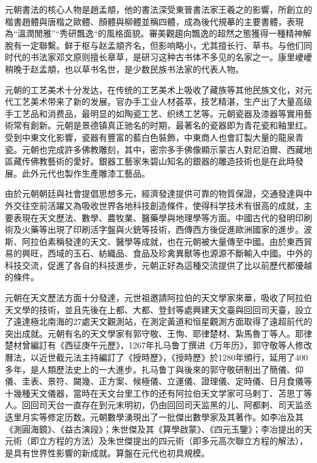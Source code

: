 元朝書法的核心人物是趙孟頫，他的書法深受東晉書法家王羲之的影響，所創立的楷書趙體與唐楷之歐體、顏體與柳體並稱四體，成為後代規摹的主要書體，表現為“溫潤閒雅”“秀研飄逸“的風格面貌。審美觀趨向飄逸的超然之態獲得一種精神解脫有一定聯繫。鲜于枢与赵孟頫齐名，但影响略小，尤其擅长行、草书。与他们同时代的书法家邓文原则擅长章草，是研习这种古书体不多见的名家之一。康里巙巙稍晚于赵孟頫，也以草书名世，是少数民族书法家的代表人物。 　

元朝的工艺美术十分发达，在传统的工艺美术上吸收了藏族等其他民族文化，对元代工艺美术带来了新的发展。官办手工业人材荟萃，技艺精湛，生产出了大量高级手工艺品和消费品，最明显的如陶瓷工艺、织绣工艺等。元朝瓷器及漆器等實用藝術常有創新。元朝是景德镇真正驰名的时期，最著名的瓷器即为青花瓷和釉里红。受到中東文化影響，瓷器有豐富的藍白色裝飾，中東商人也會訂製大量的龍泉青瓷。元朝也完成許多佛教雕刻，其中，密宗多手佛像顯示蒙古人對尼泊爾、西藏地區藏传佛教藝術的愛好。銀器工藝家朱碧山知名的銀器的雕造技術也是在此時發展。此外元代也製作生產雕漆工藝品。

由於元朝朝廷與社會提倡思想多元，經濟發達提供可靠的物質保證，交通發達與中外交往空前活躍又為吸收世界各地科技創造條件，使得科学技术有很高的成就，主要表現在天文歷法、數學、農牧業、醫藥學與地理學等方面。中國古代的發明印刷術及火藥等出現了印刷活字盤與火銃等技術，西傳西方後促進歐洲國家的進步。波斯、阿拉伯素稱發達的天文、醫學等成就，也在元朝被大量傳至中國。由於東西貿易的興旺，西域的玉石、紡織品、食品及珍禽異獸等也源源不斷輸入中國。中外的科技交流，促進了各自的科技進步，元朝正好為這種交流提供了比以前歷代都優越的條件。

元朝在天文歷法方面十分發達，元世祖邀請阿拉伯的天文學家來華，吸收了阿拉伯天文學的技術，並且先後在上都、大都、登封等處興建天文臺與回回司天臺，設立了遠達極北南海的27處天文觀測站，在測定黃道和恒星觀測方面取得了遠超前代的突出成就。元朝有名的天文學家有郭守敬、王恂、耶律楚材、紮馬魯丁等人。耶律楚材曾編訂有《西征庚午元歷》，1267年扎马鲁丁撰进《万年历》，郭守敬等人修改曆法，以近世截元法主持編訂了《授時歷》，《授時歷》於1280年頒行，延用了400多年，是人類歷法史上的一大進步。扎马鲁丁與後來的郭守敬研制出了簡儀、仰儀、圭表、景符、闚幾、正方案、候極儀、立運儀、證理儀、定時儀、日月食儀等十幾種天文儀器，當時在天文台里工作的还有阿拉伯天文学家可马剌丁、苫思丁等人。回回司天台一直存在到元末明初，仍由回回司天监黑的儿、阿都剌、司天监丞迭里月实等修定历数。元朝數學湧現出了一批傑出數學家及其著作。如李冶及其《測圓海鏡》、《益古演段》；朱世傑及其《算學啟蒙》、《四元玉鑒》；李冶提出的天元術（即立方程的方法）及朱世傑提出的四元術（即多元高次聯立方程的解法），是具有世界性影響的新成就。算盤在元代也初具規模。

